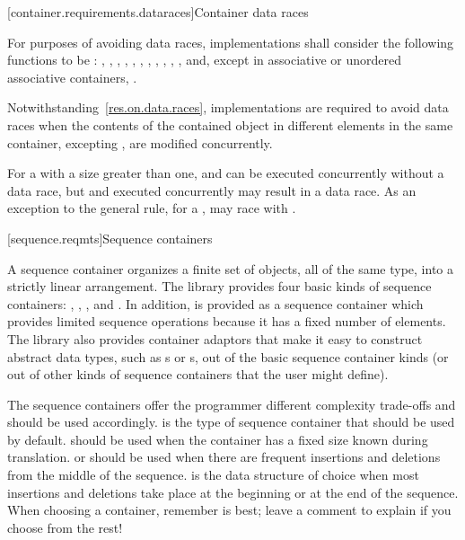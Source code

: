 [container.requirements.dataraces]{Container data races}

\pnum
For purposes of avoiding data races, implementations shall
consider the following functions to be : , ,
, , , , , ,
, , ,  and, except in
associative or unordered associative containers, .

\pnum
Notwithstanding~\ref{res.on.data.races}, implementations are required to avoid data
races when the contents of the contained object in different elements in the same
container, excepting , are modified concurrently.

\pnum
\begin{note} For a  with a size greater than one, 
and  can be executed concurrently without a data race, but
 and  executed concurrently may result in a data
race.
As an exception to the general rule, for a , 
may race with .
\end{note}

[sequence.reqmts]{Sequence containers}

\pnum
A sequence container organizes a finite set of objects, all of the same type, into a strictly
linear arrangement. The library provides four basic kinds of sequence containers:
, , , and . In addition,
 is provided as a sequence container which provides limited sequence operations
because it has a fixed number of elements. The library also provides container adaptors that
make it easy to construct abstract data types, such as s or s, out of
the basic sequence container kinds (or out of other kinds of sequence containers that the user
might define).

\pnum
\begin{note}
The sequence containers
offer the programmer different complexity trade-offs and should be used
accordingly.
is the type of sequence container that should be used by default.
should be used when the container has a fixed size known during translation.
 or 
should be used when there are frequent insertions and deletions from the
middle of the sequence.
is the data structure of choice
when most insertions and deletions take place at the beginning or at the
end of the sequence.
When choosing a container, remember  is best;
leave a comment to explain if you choose from the rest!
\end{note}

